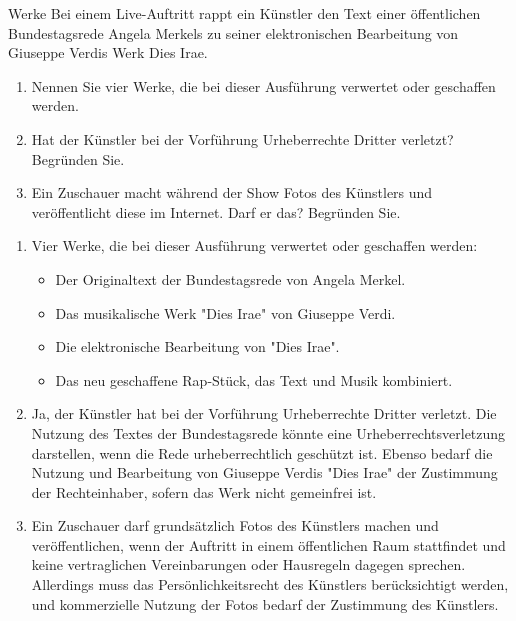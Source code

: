 \documentclass{article}
\begin{document}
\begin{exercise}{Werke}
  Bei einem Live-Auftritt rappt ein Künstler den Text einer öffentlichen Bundestagsrede Angela Merkels zu seiner elektronischen Bearbeitung von Giuseppe Verdis Werk Dies Irae.
  \begin{enumerate}
    \item Nennen Sie vier Werke, die bei dieser Ausführung verwertet oder geschaffen werden.
    \item Hat der Künstler bei der Vorführung Urheberrechte Dritter verletzt? Begründen Sie.
    \item Ein Zuschauer macht während der Show Fotos des Künstlers und veröffentlicht diese im Internet. Darf er das? Begründen Sie.
  \end{enumerate}

  \begin{solution}
    \begin{enumerate}
      \item Vier Werke, die bei dieser Ausführung verwertet oder geschaffen werden:
            \begin{itemize}
              \item Der Originaltext der Bundestagsrede von Angela Merkel.
              \item Das musikalische Werk "Dies Irae" von Giuseppe Verdi.
              \item Die elektronische Bearbeitung von "Dies Irae".
              \item Das neu geschaffene Rap-Stück, das Text und Musik kombiniert.
            \end{itemize}
      \item Ja, der Künstler hat bei der Vorführung Urheberrechte Dritter verletzt. Die Nutzung des Textes der Bundestagsrede könnte eine Urheberrechtsverletzung darstellen, wenn die Rede urheberrechtlich geschützt ist. Ebenso bedarf die Nutzung und Bearbeitung von Giuseppe Verdis "Dies Irae" der Zustimmung der Rechteinhaber, sofern das Werk nicht gemeinfrei ist.
      \item Ein Zuschauer darf grundsätzlich Fotos des Künstlers machen und veröffentlichen, wenn der Auftritt in einem öffentlichen Raum stattfindet und keine vertraglichen Vereinbarungen oder Hausregeln dagegen sprechen. Allerdings muss das Persönlichkeitsrecht des Künstlers berücksichtigt werden, und kommerzielle Nutzung der Fotos bedarf der Zustimmung des Künstlers.
    \end{enumerate}
  \end{solution}
\end{exercise}
\end{document}

